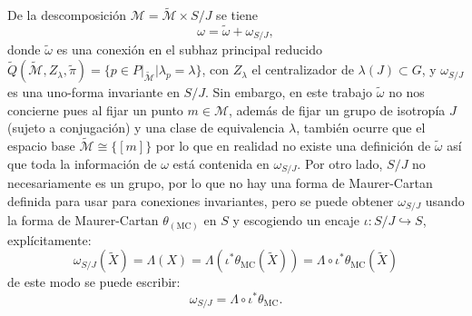 De la descomposici\'{o}n $\mathcal{M} = \mathcal{\tilde{M}} \times S/J$ se tiene
%
\begin{equation}
\omega = \tilde{\omega} + \omega_{S/J},
\end{equation}
%
donde $\tilde{\omega}$ es una conexi\'{o}n en el subhaz principal reducido $\tilde{Q}(\tilde{\mathcal{M}}, Z_{\lambda}, \tilde{\pi}) = \{p \in P \vert_{\tilde{\mathcal{M}}} \vert \lambda_{p} = \lambda\}$, con $Z_{\lambda}$ el centralizador de $\lambda(J) \subset G$, y $\omega_{S/J}$ es una uno-forma invariante en $S/J$. Sin embargo, en este trabajo $\tilde{\omega}$ no nos concierne pues al fijar un punto $m \in \mathcal{M}$, adem\'{a}s de fijar un grupo de isotrop\'{i}a $J$ (sujeto a conjugaci\'{o}n) y una clase de equivalencia $\lambda$, tambi\'{e}n ocurre que el espacio base $\tilde{\mathcal{M}} \cong \{[m]\}$ por lo que en realidad no existe una definici\'{o}n de $\tilde{\omega}$ as\'{i} que toda la informaci\'{o}n de $\omega$ est\'{a} contenida en $\omega_{S/J}$. Por otro lado, $S/J$ no necesariamente es un grupo, por lo que no hay una forma de Maurer-Cartan definida para usar para conexiones invariantes, pero se puede obtener $\omega_{S/J}$ usando la forma de Maurer-Cartan $\theta_{(\mathrm{MC})}$ en $S$ y escogiendo un encaje $\iota: S/J \hookrightarrow S$, expl\'{i}citamente:
%
\begin{equation*}
\omega_{S/J} (\tilde{X}) = \Lambda (X) = \Lambda (\iota^{*} \theta_{\mathrm{MC}} (\tilde{X})) = \Lambda \circ \iota^{*} \theta_{\mathrm{MC}} (\tilde{X})
\end{equation*}
%
de este modo se puede escribir:
%
\begin{equation}
\omega_{S/J} = \Lambda \circ \iota^{*} \theta_{\mathrm{MC}}.
\end{equation}